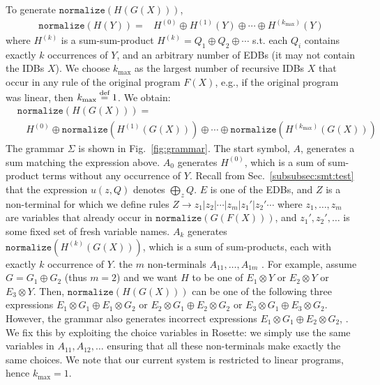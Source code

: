 To generate $\texttt{normalize}(H(G(X)))$, 
%
\begin{align*}
  \texttt{normalize}(H(Y)) = &  H^{(0)} \oplus H^{(1)}(Y) \oplus
  \cdots \oplus H^{(k_{\max})}(Y)
\end{align*}
%
where $H^{(k)}$ is a sum-sum-product
$H^{(k)} = Q_1 \oplus Q_2 \oplus \cdots$ s.t. each $Q_i$ contains
exactly $k$ occurrences of $Y$, and an arbitrary number of EDBs (it
may not contain the IDBs $X$).  We choose $k_{\max}$ as the largest
number of recursive IDBs $X$ that occur in any rule of the original
program $F(X)$, e.g.,  if the original program was linear, then
$k_{\max} \stackrel{\text{def}}{=} 1$.  We obtain:
%
{\footnotesize
\begin{align*}
  & \texttt{normalize}(H(G(X))) = \\
  & \ \ \ \   H^{(0)} \oplus \texttt{normalize}(H^{(1)}(G(X))) \oplus \cdots \oplus \texttt{normalize}(H^{(k_{\max})}(G(X)))
\end{align*}
}
%
%
The grammar $\Sigma$ is shown in Fig.~\ref{fig:grammar}.  The start
symbol, $A$, generates a sum matching the expression above.  $A_0$
generates $H^{(0)}$, which is a sum of sum-product terms without any
occurrence of $Y$.  Recall from Sec.~\ref{subsubsec:smt:test} that the
expression $u(z,Q)$ denotes $\bigoplus_z Q$.  $E$ is one of the EDBs,
and $Z$ is a non-terminal for which we define rules
$Z \rightarrow z_1 | z_2 | \cdots | z_m | z_1' | z_2' \cdots$ where
$z_1, \ldots, z_m$ are variables that already occur in
$\texttt{normalize}(G(F(X)))$, and $z_1', z_2', \ldots$ is some fixed
set of fresh variable names. $A_k$ generates
$\texttt{normalize}(H^{(k)}(G(X)))$, which is a sum of sum-products,
each with exactly $k$ occurrence of $Y$.  
the $m$ non-terminals $A_{11}, \ldots, A_{1m}$ .
For example, assume $G = G_1 \oplus G_2$ (thus $m=2$) and we want $H$
to be one of $E_1 \otimes Y$ or $E_2 \otimes Y$ or $E_3 \otimes Y$.
Then, $\texttt{normalize}(H(G(X)))$ can be one of the following three
expressions $E_1\otimes G_1 \oplus E_1 \otimes G_2$ or
$E_2 \otimes G_1 \oplus E_2 \otimes G_2$ or
$E_3 \otimes G_1 \oplus E_3 \otimes G_2$.  However, the grammar
 also generates
incorrect expressions $E_1 \otimes G_1 \oplus E_2 \otimes G_2$,
.  We fix this by exploiting the choice
variables in Rosette: we simply use the same variables in
$A_{11}, A_{12}, \ldots$ ensuring that all these non-terminals make
exactly the same choices.  We note that our current system is
restricted to linear programs, hence $k_{\max}=1$.

